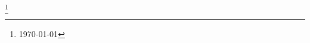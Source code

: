 \documentclass[a4paper,draft]{amsart}
\title{}
\author{Julian Wergieluk}\address{TU Chemnitz, Reichenhainer Str. 41, 09126 Chemnitz}\email{julian@wergieluk.com}
\begin{document}
\sloppy

\maketitle

\renewcommand*{\thefootnote}{}
\footnote{\today{}}



\end{document}
